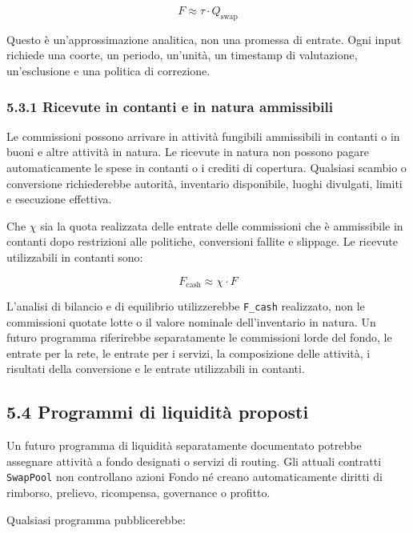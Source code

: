 \documentclass[11pt]{article}
\begin{document}
\[
F \approx \tau \cdot Q_{\mathrm{swap}}
\]

Questo è un'approssimazione analitica, non una promessa di entrate. Ogni input richiede una coorte, un periodo, un'unità, un timestamp di valutazione, un'esclusione e una politica di correzione.

\subsubsection*{5.3.1 Ricevute in contanti e in natura ammissibili}

Le commissioni possono arrivare in attività fungibili ammissibili in contanti o in buoni e altre attività in natura. Le ricevute in natura non possono pagare automaticamente le spese in contanti o i crediti di copertura. Qualsiasi scambio o conversione richiederebbe autorità, inventario disponibile, luoghi divulgati, limiti e esecuzione effettiva.

Che \texttt{$\chi$} sia la quota realizzata delle entrate delle commissioni che è ammissibile in contanti dopo restrizioni alle politiche, conversioni fallite e slippage. Le ricevute utilizzabili in contanti sono:

\[
F_{\mathrm{cash}} \approx \chi \cdot F
\]

L'analisi di bilancio e di equilibrio utilizzerebbe \texttt{F\_cash} realizzato, non le commissioni quotate lotte o il valore nominale dell'inventario in natura. Un futuro programma riferirebbe separatamente le commissioni lorde del fondo, le entrate per la rete, le entrate per i servizi, la composizione delle attività, i risultati della conversione e le entrate utilizzabili in contanti.

\subsection*{5.4 Programmi di liquidità proposti}

Un futuro programma di liquidità separatamente documentato potrebbe assegnare attività a fondo designati o servizi di routing. Gli attuali contratti \texttt{SwapPool} non controllano azioni Fondo né creano automaticamente diritti di rimborso, prelievo, ricompensa, governance o profitto.

Qualsiasi programma pubblicerebbe:
\end{document}
